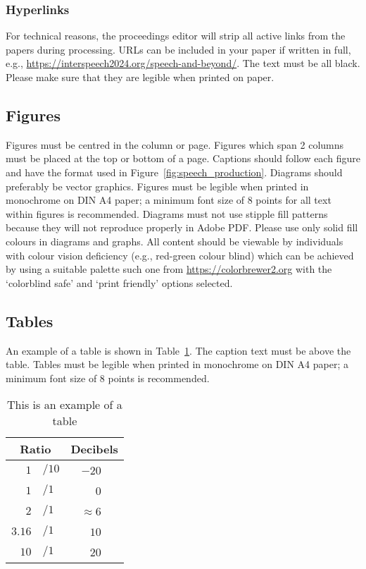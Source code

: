 \documentclass{Interspeech2024}
\begin{document}
\subsubsection{Hyperlinks}

For technical reasons, the proceedings editor will strip all active links from the papers during processing. URLs can be included in your paper if written in full, e.g., \url{https://interspeech2024.org/speech-and-beyond/}. The text must be all black. Please make sure that they are legible  when printed on paper.


\subsection{Figures}

Figures must be centred in the column or page. Figures which span 2 columns must be placed at the top or bottom of a page.
Captions should follow each figure and have the format used in Figure~\ref{fig:speech_production}. Diagrams should preferably be vector graphics. Figures must be legible when printed in monochrome on DIN A4 paper; a minimum font size of  8 points for all text within figures is recommended. Diagrams must not use stipple fill patterns because they will not reproduce properly in Adobe PDF. Please use only solid fill colours in diagrams and graphs. All content should be viewable by individuals with colour vision deficiency (e.g., red-green colour blind) which can be achieved by using a suitable palette such one from \url{https://colorbrewer2.org} with the `colorblind safe' and `print friendly' options selected.


\subsection{Tables}

An example of a table is shown in Table~\ref{tab:example}. The caption text must be above the table. Tables must be legible when printed in monochrome on DIN A4 paper; a minimum font size of 8 points is recommended.

\begin{table}[th]
  \caption{This is an example of a table}
  \label{tab:example}
  \centering
  \begin{tabular}{ r@{}l  r }
    \toprule
    \multicolumn{2}{c}{\textbf{Ratio}} & 
                                         \multicolumn{1}{c}{\textbf{Decibels}} \\
    \midrule
    $1$                       & $/10$ & $-20$~~~             \\
    $1$                       & $/1$  & $0$~~~               \\
    $2$                       & $/1$  & $\approx 6$~~~       \\
    $3.16$                    & $/1$  & $10$~~~              \\
    $10$                      & $/1$  & $20$~~~              \\
    \bottomrule
  \end{tabular}
  
\end{table}
\end{document}
